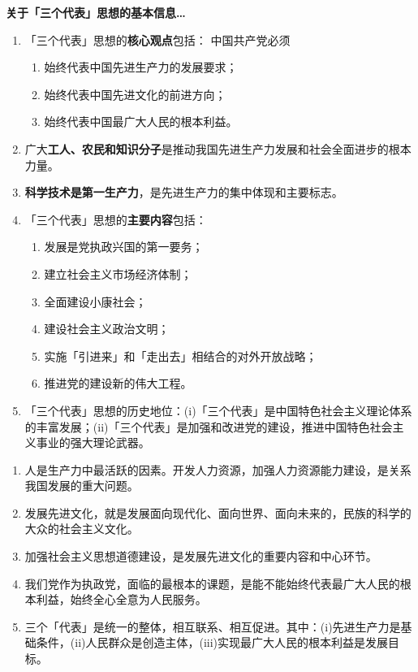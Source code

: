 \documentclass[UTF8]{ctexart}
\newcommand\Emph[2]{\colorbox{c#1-light}{\textcolor{c#1-emph}{\textbf{#2}}}}
\begin{document}
\begin{mybox}{7}
\textbf{关于「三个代表」思想的基本信息…}
\begin{enumerate}
  \item 「三个代表」思想的\Emph{7}{核心观点}包括： 中国共产党必须
  \begin{enumerate}[label={\roman{enumii})}, start=1]
    \item 始终代表中国先进生产力的发展要求；
    \item 始终代表中国先进文化的前进方向；
    \item 始终代表中国最广大人民的根本利益。
  \end{enumerate}
  \item 广大\Emph{7}{工人、农民和知识分子}是推动我国先进生产力发展和社会全面进步的根本力量。
  \item \Emph{7}{科学技术是第一生产力}，是先进生产力的集中体现和主要标志。
  \item 「三个代表」思想的\Emph{7}{主要内容}包括：
  \begin{enumerate}[label={\roman{enumii})}, start=1]
    \item 发展是党执政兴国的第一要务；
    \item 建立社会主义市场经济体制；
    \item 全面建设小康社会；
    \item 建设社会主义政治文明；
    \item 实施「引进来」和「走出去」相结合的对外开放战略；
    \item 推进党的建设新的伟大工程。
  \end{enumerate}
  \item 「三个代表」思想的历史地位：(i)「三个代表」是中国特色社会主义理论体系的丰富发展；(ii)「三个代表」是加强和改进党的建设，推进中国特色社会主义事业的强大理论武器。
\end{enumerate}
\end{mybox}

\begin{enumerate}[start=13]
  \item 人是生产力中最活跃的因素。开发人力资源，加强人力资源能力建设，是关系我国发展的重大问题。
  \item 发展先进文化，就是发展面向现代化、面向世界、面向未来的，民族的科学的大众的社会主义文化。
  \item 加强社会主义思想道德建设，是发展先进文化的重要内容和中心环节。
  \item 我们党作为执政党，面临的最根本的课题，是能不能始终代表最广大人民的根本利益，始终全心全意为人民服务。
  \item 三个「代表」是统一的整体，相互联系、相互促进。其中：(i)先进生产力是基础条件，(ii)人民群众是创造主体，(iii)实现最广大人民的根本利益是发展目标。
\end{enumerate}
\end{document}
